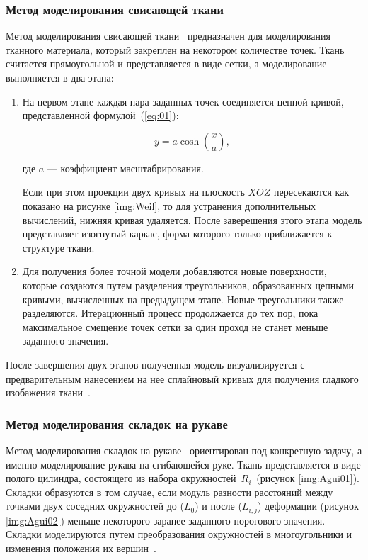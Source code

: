 \subsubsection{Метод моделирования свисающей ткани}
Метод моделирования свисающей ткани~\cite{bib08} предназначен для моделирования
тканного материала, который закреплен на некотором количестве точек. Ткань
считается прямоугольной и представляется в виде сетки, а моделирование
выполняется в два этапа:
\begin{enumerate}[label=\arabic*)]
    \item На первом этапе каждая пара заданных точeк соединяется цепной кривой,
        представленной формулой~(\ref{eq:01}):

        \begin{equation}\label{eq:01}
            y = a\cosh(\frac{x}{a}),
        \end{equation}

        где $a$ --- коэффициент масштабрирования.

        Если при этом проекции двух кривых на плоскость $XOZ$ пересекаются как
        показано на рисунке \ref{img:Weil}, то для устранения дополнительных
        вычислений, нижняя кривая удаляется. После заверешения этого этапа
        модель представляет изогнутый каркас, форма которого только приближается
        к структуре ткани. 


    \item Для получения более точной модели добавляются новые поверхности,
        которые создаются путем разделения треугольников, образованных цепными
        кривыми, вычисленных на предыдущем этапе.  Новые треугольники также
        разделяются. Итерационный процесс продолжается до тех пор, пока
        максимальное смещение точек сетки за один проход не станет меньше
        заданного значения.
\end{enumerate}

После завершения двух этапов полученная модель визуализируется с
предварительным нанесением на нее сплайновый кривых для получения
гладкого изобажения ткани~\cite{bib07, bib08}.

\subsubsection{Метод моделирования складок на рукаве}

Метод моделирования складок на рукаве~\cite{bib07} ориентирован под конкретную
задачу, а именно моделирование рукава на сгибающейся руке.  Ткань представляется
в виде полого цилиндра, состоящего из набора окружностей~$R_i$~(рисунок
\ref{img:Agui01}). Складки образуются в том случае, если модуль разности
расстояний между точками двух соседних окружностей до ($L_0$) и после
($L_{i,j}$) деформации (рисунок \ref{img:Agui02})
меньше некоторого заранее заданного порогового значения. Складки моделируются
путем преобразования окружностей в многоугольники и изменения положения их
вершин~\cite{bib07}.

